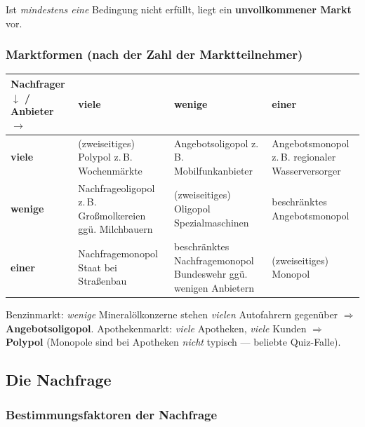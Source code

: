 \documentclass[11pt, a4paper]{article}
\begin{document}
Ist \emph{mindestens eine} Bedingung nicht erfüllt, liegt ein \textbf{unvollkommener
Markt} vor.

\subsubsection{Marktformen (nach der Zahl der Marktteilnehmer)}

\begin{center}
\begin{tabular}{p{2.6cm}|p{3.6cm}|p{3.6cm}|p{3.9cm}}
\textbf{Nachfrager $\downarrow$ / Anbieter $\rightarrow$} & \textbf{viele} & \textbf{wenige} & \textbf{einer}\\
\hline
\textbf{viele} & (zweiseitiges) Polypol \newline \small z.\,B. Wochenmärkte & Angebotsoligopol \newline \small z.\,B. Mobilfunkanbieter & Angebotsmonopol \newline \small z.\,B. regionaler Wasserversorger\\
\hline
\textbf{wenige} & Nachfrageoligopol \newline \small z.\,B. Großmolkereien ggü. Milchbauern & (zweiseitiges) Oligopol \newline \small Spezialmaschinen & beschränktes Angebotsmonopol\\
\hline
\textbf{einer} & Nachfragemonopol \newline \small Staat bei Straßenbau & beschränktes Nachfragemonopol \newline \small Bundeswehr ggü. wenigen Anbietern & (zweiseitiges) Monopol\\
\end{tabular}
\end{center}

\begin{beispiel}
Benzinmarkt: \emph{wenige} Mineralölkonzerne stehen \emph{vielen} Autofahrern gegenüber
$\Rightarrow$ \textbf{Angebotsoligopol}. Apothekenmarkt: \emph{viele} Apotheken,
\emph{viele} Kunden $\Rightarrow$ \textbf{Polypol} (Monopole sind bei Apotheken
\emph{nicht} typisch --- beliebte Quiz-Falle).
\end{beispiel}

\subsection{Die Nachfrage}

\subsubsection{Bestimmungsfaktoren der Nachfrage}
\end{document}
